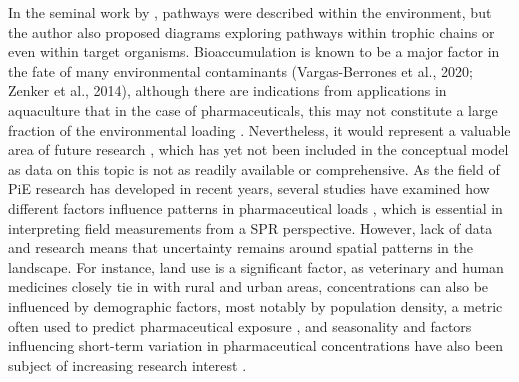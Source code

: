 \documentclass{article}
\begin{document}
In the  seminal work by \citet{Holdgate1979APollution.}, pathways were described within the environment, but the author also proposed diagrams exploring pathways within trophic chains or even within target organisms. Bioaccumulation is known to be a major factor in the fate of many environmental contaminants (Vargas-Berrones et al., 2020; Zenker et al., 2014), although there are indications from applications in aquaculture that in the case of pharmaceuticals, this may not constitute a large fraction of the environmental loading \citep{Rico2013ProbabilisticAsia}. Nevertheless, it would represent a valuable area of future research  \citep{Stuart2012ReviewGroundwater}, which has yet not been included in the conceptual model as data on this topic is not as readily available or comprehensive. As the field of PiE research has developed in recent years, several studies have examined how different factors influence patterns in pharmaceutical loads \citep{Burns2018TemporalSystem,Vatovec2016InvestigatingSetting}, which is essential in interpreting field measurements from a SPR perspective. However, lack of data and research means that uncertainty remains around spatial patterns in the landscape. For instance, land use is a significant factor, as veterinary and human medicines closely tie in with rural and urban areas, concentrations can also be influenced by demographic factors, most notably by population density, a metric often used to predict pharmaceutical exposure \citep{Brodin2014EcologicalAlterations,Jameel2020SpatialRivers}, and seasonality and factors influencing short-term variation in pharmaceutical concentrations have also been subject of increasing research interest \citep{Burns2018ApplicationPharmaceuticals}.
\end{document}
